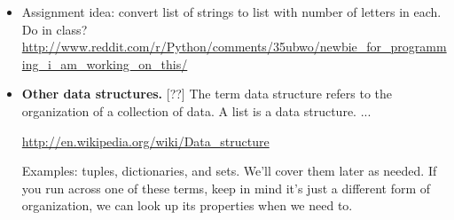 \documentclass[11pt]{article}
\begin{document}
\begin{itemize}
\item Assignment idea:  convert list of strings to list with number of letters in each.  \\
Do in class?  \\
\url{http://www.reddit.com/r/Python/comments/35ubwo/newbie_for_programming_i_am_working_on_this/}


\item {\bf Other data structures.\/} [??]
The term data structure refers to the organization of a collection of data.
A list is a data structure.  ...

\url{http://en.wikipedia.org/wiki/Data_structure}

Examples: tuples, dictionaries, and sets.  We'll cover them later as needed.
If you run across one of these terms, keep in mind it's just a different form
of organization, we can look up its properties when we need to.

\end{itemize}
\end{document}
